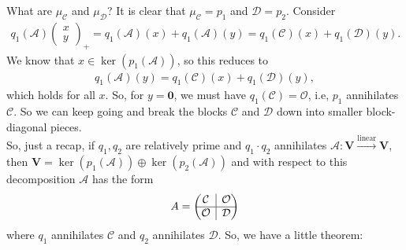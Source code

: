 \documentclass{article}
\theoremstyle{definition}
\newcommand{\V}{\mathbf{V}}
\newcommand{\A}{\mathcal{A}}
\newcommand{\lin}{\overset{\text{linear}}{\longrightarrow}}
\newcommand{\rvline}{\hspace*{-\arraycolsep}\vline\hspace*{-\arraycolsep}}
\begin{document}
What are $\mu_\mathcal{C}$ and $\mu_\mathcal{D}$? It is clear that $\mu_\mathcal{C} = p_1$ and $\mathcal{D} = p_2$. Consider
\begin{align*}
q_1(\A)\begin{pmatrix}
x\\y
\end{pmatrix}_+ = q_1(\mathcal{A})(x) + q_1(\mathcal{A})(y) = q_1(\mathcal{C})(x) + q_1(\mathcal{D})(y).
\end{align*}
We know that $x\in \ker(p_1(\A))$, so this reduces to
\begin{align*}
q_1(\mathcal{A})(y) = q_1(\mathcal{C})(x) + q_1(\mathcal{D})(y),
\end{align*}
which holds for all $x$. So, for $y = \mathbf{0}$, we must have $q_1(\mathcal{C}) = \mathcal{O}$, i.e, $p_1$ annihilates $\mathcal{C}$. So we can keep going and break the blocks $\mathcal{C}$ and $\mathcal{D}$ down into smaller block-diagonal pieces. \\

So, just a recap, if $q_1, q_2$ are relatively prime and $q_1\cdot q_2$ annihilates $\A : \V \lin \V$, then $\V = \ker(p_1(\A)) \oplus \ker(p_2(\A))$ and with respect to this decomposition $\A$ has the form
\begin{align*}
A = \begin{pmatrix}
\mathcal{C} & \rvline & \mathcal{O}\\
\hline
\mathcal{O} & \rvline & \mathcal{D}
\end{pmatrix}
\end{align*}
where $q_1$ annihilates $\mathcal{C}$ and $q_2$ annihilates $\mathcal{D}$. So, we have a little theorem:
\end{document}
